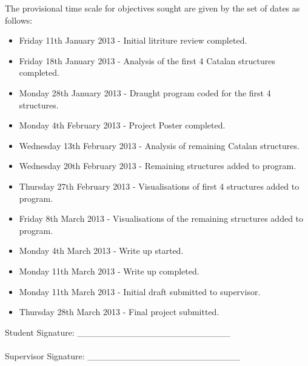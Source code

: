 \documentclass[10pt]{article}
\begin{document}
The provisional time scale for objectives sought are given by the set of dates as follows:
\begin{itemize}
\renewcommand{\labelitemi}{$\bullet$}

\item Friday 11th January 2013 - Initial litriture review completed.

\item Friday 18th January 2013 - Analysis of the first 4 Catalan structures completed.

\item Monday 28th January 2013 - Draught program coded for the first 4 structures.

\item Monday 4th February 2013 - Project Poster completed.

\item Wednesday 13th February 2013 - Analysis of remaining Catalan structures.

\item Wednesday 20th February 2013 - Remaining structures added to program.

\item Thursday 27th February 2013 - Visualisations of first 4 structures added to program.

\item Friday 8th March 2013 - Visualisations of the remaining structures added to program.

\item Monday 4th March 2013 - Write up started.

\item Monday 11th March 2013 - Write up completed.

\item Monday 11th March 2013 - Initial draft submitted to supervisor.

\item Thursday 28th March 2013 - Final project submitted.
\end{itemize}

Student Signature: \_\_\_\_\_\_\_\_\_\_\_\_\_\_\_\_\_\_\_\_\_\_\_\_ \\ \\
Supervisor Signature: \_\_\_\_\_\_\_\_\_\_\_\_\_\_\_\_\_\_\_\_\_\_\_\_



\end{document}
